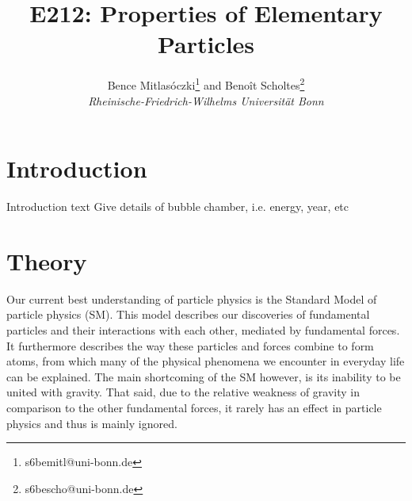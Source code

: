 \documentclass[twocolumn]{article}
\title{\textbf{E212: Properties of Elementary Particles}}
\author{Bence Mitlasóczki\thanks{s6bemitl@uni-bonn.de} and Beno\^it Scholtes\thanks{s6bescho@uni-bonn.de} \\ \textit{Rheinische-Friedrich-Wilhelms Universit\"at Bonn}}
\begin{document}
\renewcommand{\abstractname}{\vspace{-\baselineskip}} %
\maketitle
\saythanks %
\section{Introduction}
Introduction text
Give details of bubble chamber, i.e. energy, year, etc

\section{Theory}
Our current best understanding of particle physics is the Standard Model of particle physics (SM). This model describes our discoveries of fundamental particles and their interactions with each other, mediated by fundamental forces. It furthermore describes the way these particles and forces combine to form atoms, from which many of the physical phenomena we encounter in everyday life can be explained. The main shortcoming of the SM however, is its inability to be united with gravity. That said, due to the relative weakness of gravity in comparison to the other fundamental forces, it rarely has an effect in particle physics and thus is mainly ignored.
\end{document}

